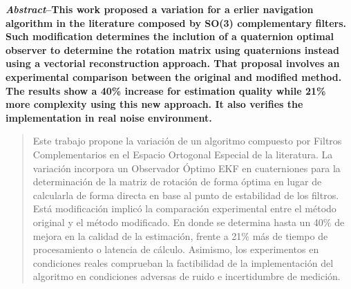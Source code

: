 \documentclass[conference]{IEEEtran}
\begin{document}




\maketitle
\textbf{\small \emph{Abstract}--This work proposed a variation for a erlier navigation algorithm in the literature composed by SO(3) complementary filters. Such modification determines the inclution of a quaternion optimal observer to determine  the rotation matrix using quaternions instead using a vectorial reconstruction approach. That proposal involves an experimental comparison between the original and modified method. The results show a 40\% increase for estimation quality while 21\% more complexity using this new approach. It also verifies the implementation in real noise environment.\\[3mm]}
\begin{abstract}
Este trabajo propone la variación de un algoritmo compuesto por Filtros Complementarios en el Espacio Ortogonal Especial de la literatura. La variación incorpora un Observador Óptimo EKF en cuaterniones para la determinación de la matriz de rotación de forma óptima en lugar de calcularla de forma directa en base al punto de estabilidad de los filtros. Está modificación implicó la comparación experimental entre el método original y el método modificado. En donde se determina hasta un 40\% de mejora en la calidad de la estimación, frente a 21\% más de tiempo de procesamiento o latencia de cálculo. Asimismo, los experimentos en condiciones reales comprueban la factibilidad de la implementación del algoritmo en condiciones adversas de ruido e incertidumbre de medición.\end{abstract}





%
\IEEEpeerreviewmaketitle
\end{document}
